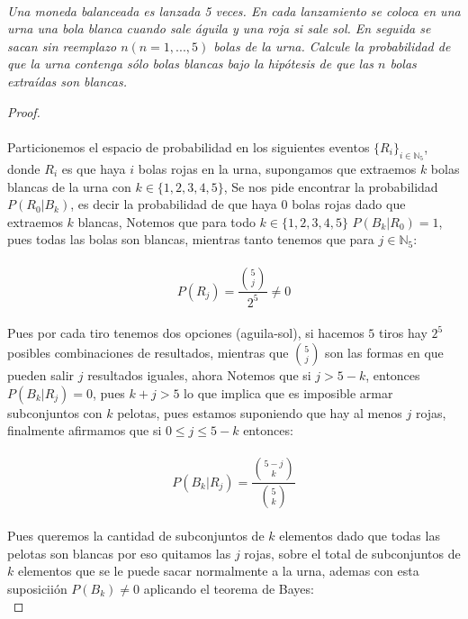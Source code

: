 \documentclass[11pt,letterpaper]{article}
\newcommand{\N}{\mathbb{N}}
\begin{document}
\,\\
\begin{tcolorbox}[
	title = \textcolor{black}{\textcolor{white}{Problema 7}},]
\textit{Una moneda balanceada es lanzada 5 veces. En cada lanzamiento se coloca
en una urna una bola blanca cuando sale águila y una roja si sale sol. En
seguida se sacan sin reemplazo $n (n = 1, . . . , 5)$ bolas de la urna. Calcule la
probabilidad de que la urna contenga sólo bolas blancas bajo la hipótesis
de que las $n$ bolas extraídas son blancas.
}
\end{tcolorbox}
\begin{proof}\,\\
    \,\\
Particionemos el espacio de probabilidad en los siguientes eventos $\{R_i\}_{i\in \N_5}$, donde $R_i$ es que haya $i$ bolas rojas en la urna, supongamos que extraemos $k$ bolas blancas de la urna con $k\in \{1,2,3,4,5\}$,
Se nos pide encontrar la probabilidad $P(R_0|B_k)$, es decir la probabilidad de que haya $0$ bolas rojas dado que extraemos $k$ blancas,
Notemos que para todo $k\in\{1,2,3,4,5\}$ $P(B_k|R_0)=1$, pues todas las bolas son blancas, mientras tanto tenemos que para $j\in\N_5$:\,\\
\,\\
\begin{equation*}
    P(R_j)=\frac{\binom{5}{j}}{2^5}\neq 0
\end{equation*}\,\\
Pues por cada tiro tenemos dos opciones (aguila-sol), si hacemos $5$ tiros hay $2^5$ posibles combinaciones de resultados, mientras que $\binom{5}{j}$ son las formas en que pueden salir $j$ resultados iguales, ahora Notemos
que si $j>5-k$, entonces $P(B_k|R_j)=0$, pues $k+j>5$ lo que implica que es imposible armar subconjuntos con $k$ pelotas, pues estamos suponiendo que hay al menos $j$ rojas, finalmente afirmamos que si $0\leq j \leq 5-k$ entonces:\,\\
\,\\
\begin{equation*}
    P(B_k|R_j)=\frac{\binom{5-j}{k}}{\binom{5}{k}}
\end{equation*}\,\\
Pues queremos la cantidad de subconjuntos de $k$ elementos dado que todas las pelotas son blancas por eso quitamos las $j$ rojas, sobre el total de subconjuntos de $k$ elementos que se le puede sacar normalmente a la urna, ademas con esta suposicii\'on $P(B_k)\neq 0$ aplicando el teorema de Bayes:\,\\

\end{proof}
\end{document}
